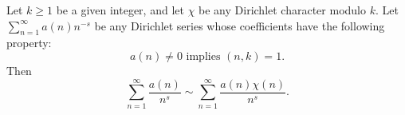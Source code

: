\begin{theorem}[Theorem 8.17]
Let $k \geq 1$ be a given integer, and let $\chi$ be any Dirichlet character modulo $k$.
Let $\sum_{n=1}^{\infty} a(n)n^{-s}$ be any Dirichlet series whose coefficients have the following property:
$$a(n) \neq 0 \text{ implies } (n, k) = 1.$$
Then
$$\sum_{n=1}^{\infty} \frac{a(n)}{n^s} \sim \sum_{n=1}^{\infty} \frac{a(n)\chi(n)}{n^s}.$$
\end{theorem}
